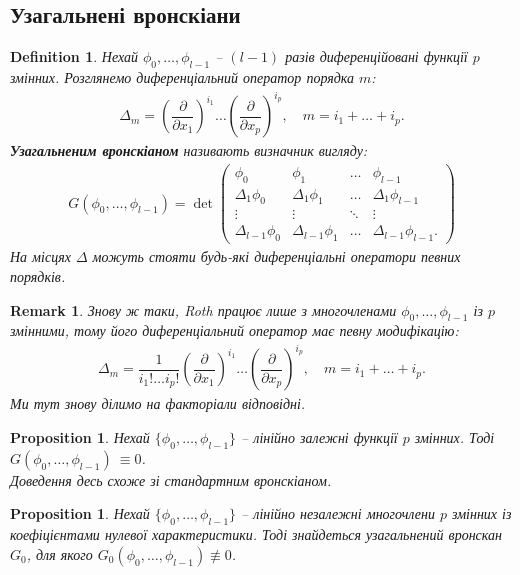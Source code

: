 \documentclass[a4paper, 10pt]{article}
\theoremstyle{theoremdd}
\theoremstyle{theoremdd}
\newtheorem{definition}[theorem]{Definition}
\theoremstyle{theoremdd}
\theoremstyle{theoremdd}
\theoremstyle{theoremdd}
\theoremstyle{theoremdd}
\theoremstyle{theoremdd}
\theoremstyle{theoremdd}
\theoremstyle{theoremdd}
\newtheorem{proposition}[theorem]{Proposition}
\theoremstyle{theoremdd}
\theoremstyle{theoremdd}
\newtheorem{remark}[theorem]{Remark}
\theoremstyle{theoremdd}
\theoremstyle{theoremdd}
\theoremstyle{theoremdd}
\theoremstyle{theoremdd}
\begin{document}
\subsection{Узагальнені вронскіани}
\begin{definition}
Нехай $\phi_0,\dots,\phi_{l-1}$ -- $(l-1)$ разів диференційовані функції $p$ змінних. Розглянемо диференціальний оператор порядка $m$:
\begin{align*}
\Delta_m = \left(\dfrac{\partial}{\partial x_1}\right)^{i_1} \dots \left(\dfrac{\partial}{\partial x_p}\right)^{i_p},\quad m = i_1+\dots+i_p.
\end{align*}
\textbf{Узагальненим вронскіаном} називають визначник вигляду:
\begin{align*}
G(\phi_0,\dots,\phi_{l-1}) = \det \begin{pmatrix}
\phi_0 & \phi_1 & \dots & \phi_{l-1} \\
\Delta_1 \phi_0 & \Delta_1 \phi_1 & \dots & \Delta_1 \phi_{l-1} \\
\vdots & \vdots & \ddots & \vdots \\
\Delta_{l-1} \phi_0 & \Delta_{l-1} \phi_1 & \dots & \Delta_{l-1} \phi_{l-1}.
\end{pmatrix}
\end{align*}
На місцях $\Delta$ можуть стояти будь-які диференціальні оператори певних порядків.
\end{definition}

\begin{remark}
Знову ж таки, Roth працює лише з многочленами $\phi_0,\dots,\phi_{l-1}$ із $p$ змінними, тому його диференціальний оператор має певну модифікацію:
\begin{align*}
\Delta_m = \dfrac{1}{i_1 ! \dots i_p !} \left(\dfrac{\partial}{\partial x_1}\right)^{i_1} \dots \left(\dfrac{\partial}{\partial x_p}\right)^{i_p},\quad m = i_1+\dots+i_p.
\end{align*}
Ми тут знову ділимо на факторіали відповідні.
\end{remark}

\begin{proposition}
Нехай $\{\phi_0,\dots,\phi_{l-1}\}$ -- лінійно залежні функції $p$ змінних. Тоді $G(\phi_0,\dots,\phi_{l-1}) ~{\equiv 0}$.\\
\textit{Доведення десь схоже зі стандартним вронскіаном.}
\end{proposition}

\begin{proposition}
Нехай $\{\phi_0,\dots,\phi_{l-1}\}$ -- лінійно незалежні многочлени $p$ змінних із коефіцієнтами нулевої характеристики. Тоді знайдеться узагальнений вронскан $G_0$, для якого $G_0(\phi_0,\dots,\phi_{l-1}) \not\equiv 0$.
\end{proposition}
\end{document}
